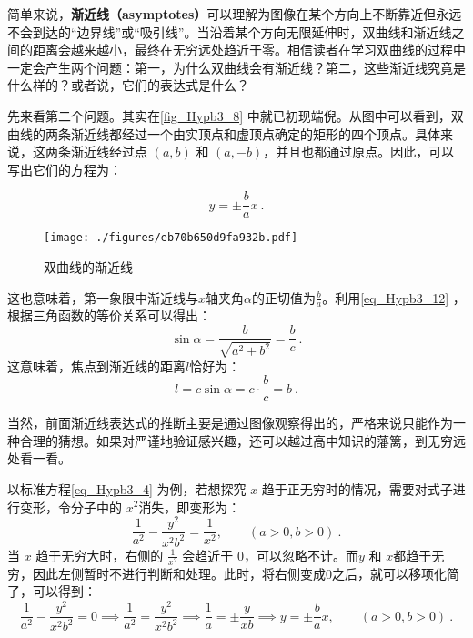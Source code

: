 简单来说，\textbf{渐近线（asymptotes）}可以理解为图像在某个方向上不断靠近但永远不会到达的“边界线”或“吸引线”。当沿着某个方向无限延伸时，双曲线和渐近线之间的距离会越来越小，最终在无穷远处趋近于零。相信读者在学习双曲线的过程中一定会产生两个问题：第一，为什么双曲线会有渐近线？第二，这些渐近线究竟是什么样的？或者说，它们的表达式是什么？

先来看第二个问题。其实在\autoref{fig_Hypb3_8} 中就已初现端倪。从图中可以看到，双曲线的两条渐近线都经过一个由实顶点和虚顶点确定的矩形的四个顶点。具体来说，这两条渐近线经过点 $(a,b)$ 和 $(a,-b)$，并且也都通过原点。因此，可以写出它们的方程为：

\begin{equation}\label{eq_Hypb3_16}
y=\pm\frac{b}{a}x~.
\end{equation}

\begin{figure}[ht]
\centering
\texttt{[image: ./figures/eb70b650d9fa932b.pdf]}
\caption{双曲线的渐近线} \label{fig_Hypb3_1}
\end{figure}

这也意味着，第一象限中渐近线与$x$轴夹角$\alpha$的正切值为$\displaystyle\frac{b}{a}$。利用\autoref{eq_Hypb3_12} ，根据三角函数的等价关系可以得出：
\begin{equation}
\sin\alpha=\frac{b}{\sqrt{a^2+b^2}}=\frac{b}{c}~.
\end{equation}
这意味着，焦点到渐近线的距离$l$恰好为：
\begin{equation}\label{eq_Hypb3_11}
l=c\sin\alpha = c\cdot \frac{b}{c} = b~.
\end{equation}

当然，前面渐近线表达式的推断主要是通过图像观察得出的，严格来说只能作为一种合理的猜想。如果对严谨地验证感兴趣，还可以越过高中知识的藩篱，到无穷远处看一看。

以标准方程\autoref{eq_Hypb3_4} 为例，若想探究 $x$ 趋于正无穷时的情况，需要对式子进行变形，令分子中的 $x^2$消失，即变形为：
\begin{equation}
\frac{1}{a^2} - \frac{y^2}{x^2b^2} =  \frac{1}{x^2} ,\qquad(a>0,b>0)~.
\end{equation}
当 $x$ 趋于无穷大时，右侧的 $\frac{1}{x^2}$ 会趋近于 $0$，可以忽略不计。而$y$ 和 $x$都趋于无穷，因此左侧暂时不进行判断和处理。此时，将右侧变成$0$之后，就可以移项化简了，可以得到：
\begin{equation}\label{eq_Hypb3_18}
\frac{1}{a^2} - \frac{y^2}{x^2b^2} = 0 \implies\frac{1}{a^2} = \frac{y^2}{x^2b^2}\implies \frac{1}{a} = \pm\frac{y}{xb}\implies y=\pm\frac{b}{a}x,\qquad(a>0,b>0)~.
\end{equation}

